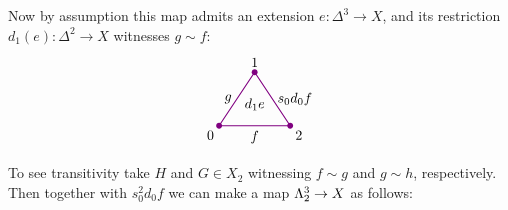         Now by assumption this map admits an extension $e \colon \Delta^3 \to X$, and its restriction $d_1(e) \colon \Delta^2 \to X$ witnesses $g \sim f$:
        \begin{equation*}
            \begin{tikzpicture}[
                scale=0.9, 
                thick, 
                color=violet, 
                every node/.style={text=black},
                dot/.style={circle, fill=violet, inner sep=1.5pt, outer sep=0pt}
            ]

                \coordinate (O) at (0,0);       %
                \coordinate (A) at (1, 1.5);    %
                \coordinate (B) at (2, 0);      %

                \draw (O) -- node[left] {$g$} (A) 
                    -- node[right] {$s_0 d_0 f$} (B) 
                    -- node[below] {$f$} cycle;

                \node[dot] at (O) {};
                \node[dot] at (A) {};
                \node[dot] at (B) {};

                \node[below left] at (O) {0};
                \node[above] at (A) {1};
                \node[below right] at (B) {2};

                \node[scale=1.0] at (1, 0.6) {$d_1 e$};

            \end{tikzpicture}            
        \end{equation*}
        To see transitivity take $H$ and $G \in X_2$ witnessing $f \sim g$ and $g \sim h$, respectively. Then together with $s^2_0 d_0 f$ we can make a map $\Lambda^{3}_{2} \to X$ as follows:
